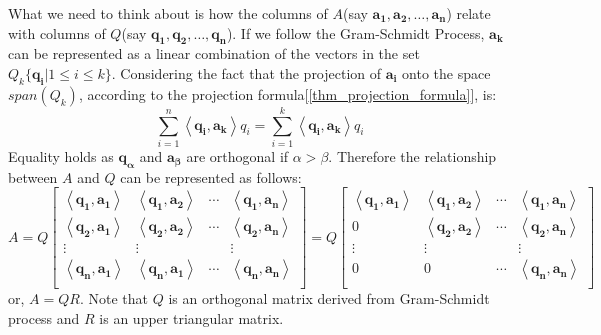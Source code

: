 \documentclass{report}
\begin{document}
			What we need to think about is how the columns of $A$(say $\bm{a_1}, \bm{a_2}, \dots, \bm{a_n}$) relate with columns of $Q$(say $\bm{q_1}, \bm{q_2}, \dots, \bm{q_n}$). If we follow the Gram-Schmidt Process, $\bm{a_k}$ can be represented as a linear combination of the vectors in the set $Q_k\{\bm{q_i}|1 \le i \le k\}$. Considering the fact that the projection of $\bm{a_i}$ onto the space $span(Q_k)$, according to the projection formula[\ref{thm_projection_formula}], is:
			\begin{displaymath}
				\sum_{i=1}^{n}\left<\bm{q_i},\bm{a_k}\right>q_i=\sum_{i=1}^{k}\left<\bm{q_i},\bm{a_k}\right>q_i
			\end{displaymath}
			Equality holds as $\bm{q_\alpha}$ and $\bm{a_\beta}$ are orthogonal if $\alpha>\beta$. Therefore the relationship between $A$ and $Q$ can be represented as follows:
			\begin{displaymath}
				A
				=
				Q
				\begin{bmatrix}
					\left<\bm{q_1}, \bm{a_1}\right> & \left<\bm{q_1}, \bm{a_2}\right> & \cdots & \left<\bm{q_1}, \bm{a_n}\right> \\
					\left<\bm{q_2}, \bm{a_1}\right> & \left<\bm{q_2}, \bm{a_2}\right> & \cdots & \left<\bm{q_2}, \bm{a_n}\right> \\
					\vdots                          & \vdots                          &        & \vdots                          \\
					\left<\bm{q_n}, \bm{a_1}\right> & \left<\bm{q_n}, \bm{a_1}\right> & \cdots & \left<\bm{q_n}, \bm{a_n}\right> \\
				\end{bmatrix}
				=
				Q
				\begin{bmatrix}
				\left<\bm{q_1}, \bm{a_1}\right> & \left<\bm{q_1}, \bm{a_2}\right> & \cdots & \left<\bm{q_1}, \bm{a_n}\right> \\
				0                               & \left<\bm{q_2}, \bm{a_2}\right> & \cdots & \left<\bm{q_2}, \bm{a_n}\right> \\
				\vdots                          & \vdots                          &        & \vdots                          \\
				0                               & 0                               & \cdots & \left<\bm{q_n}, \bm{a_n}\right> \\
				\end{bmatrix}
			\end{displaymath}
			or, $A=QR$. Note that $Q$ is an orthogonal matrix derived from Gram-Schmidt process and $R$ is an upper triangular matrix.
		
\end{document}
